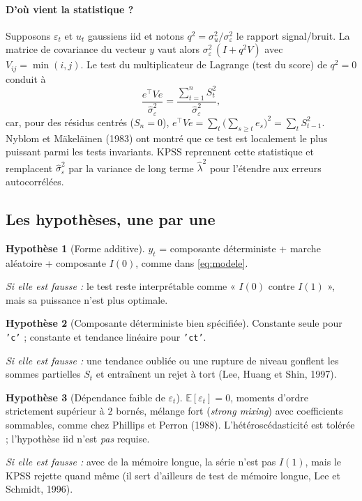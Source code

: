 \documentclass[11pt,a4paper]{article}
\newcommand{\E}{\mathbb{E}}
\newcommand{\lhat}{\hat\lambda^2}
\newcommand{\code}[1]{\texttt{#1}}
\theoremstyle{definition}
\newtheorem{hyp}{Hypothèse}
\begin{document}
\paragraph{D'où vient la statistique ?} Supposons $\varepsilon_t$ et $u_t$ gaussiens iid et notons $q^2 = \sigma_u^2/\sigma_\varepsilon^2$ le rapport signal/bruit. La matrice de covariance du vecteur $y$ vaut alors $\sigma_\varepsilon^2\,(I + q^2 V)$ avec $V_{ij} = \min(i,j)$. Le test du multiplicateur de Lagrange (test du score) de $q^2 = 0$ conduit à
\[
\frac{e^\top V e}{\hat\sigma_\varepsilon^2} = \frac{\sum_{t=1}^{n} S_t^2}{\hat\sigma_\varepsilon^2},
\]
car, pour des résidus centrés ($S_n = 0$), $e^\top V e = \sum_{t}\bigl(\sum_{s \ge t} e_s\bigr)^2 = \sum_t S_{t-1}^2$. Nyblom et Mäkeläinen (1983) ont montré que ce test est localement le plus puissant parmi les tests invariants. KPSS reprennent cette statistique et remplacent $\hat\sigma_\varepsilon^2$ par la variance de long terme $\lhat$ pour l'étendre aux erreurs autocorrélées.

\subsection{Les hypothèses, une par une}

\begin{hyp}[Forme additive]
$y_t$ = composante déterministe + marche aléatoire + composante $I(0)$, comme dans \eqref{eq:modele}.

\emph{Si elle est fausse :} le test reste interprétable comme « $I(0)$ contre $I(1)$ », mais sa puissance n'est plus optimale.
\end{hyp}

\begin{hyp}[Composante déterministe bien spécifiée]
Constante seule pour \code{'c'} ; constante et tendance linéaire pour \code{'ct'}.

\emph{Si elle est fausse :} une tendance oubliée ou une rupture de niveau gonflent les sommes partielles $S_t$ et entraînent un rejet à tort (Lee, Huang et Shin, 1997).
\end{hyp}

\begin{hyp}[Dépendance faible de $\varepsilon_t$]
$\E[\varepsilon_t] = 0$, moments d'ordre strictement supérieur à $2$ bornés, mélange fort (\emph{strong mixing}) avec coefficients sommables, comme chez Phillips et Perron (1988). L'hétéroscédasticité est tolérée ; l'hypothèse iid n'est \emph{pas} requise.

\emph{Si elle est fausse :} avec de la mémoire longue, la série n'est pas $I(1)$, mais le KPSS rejette quand même (il sert d'ailleurs de test de mémoire longue, Lee et Schmidt, 1996).
\end{hyp}
\end{document}
